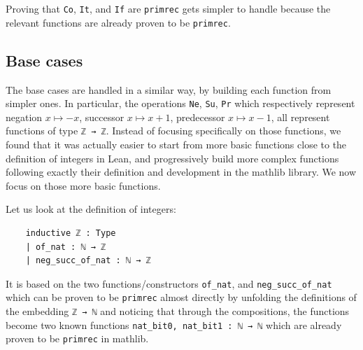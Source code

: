\documentclass[preprint]{elsarticle}
\theoremstyle{remark}
\newcommand{\MATHLIB}{\textsf{mathlib}\xspace}
\newcommand{\LEAN}{\textsf{Lean}\xspace}
\begin{document}
\vspace{\baselineskip}
Proving that \lstinline|Co|, \lstinline|It|, and \lstinline|If| are \lstinline|primrec| gets simpler to handle because the relevant functions are already proven to be \lstinline|primrec|.

\subsection{Base cases}
The base cases are handled in a similar way, by building each function from simpler ones. In particular, the operations \lstinline|Ne|, \lstinline|Su|, \lstinline|Pr| which respectively represent negation $x\mapsto-x$, successor $x\mapsto x+1$, predecessor $x\mapsto x-1$, all represent functions of type \lstinline|ℤ → ℤ|. Instead of focusing specifically on those functions, we found that it was actually easier to start from more basic functions close to the definition of integers in \LEAN, and progressively build more complex functions following exactly their definition and development in the \MATHLIB library. We now focus on those more basic functions.

\vspace{\baselineskip}
Let us look at the definition of integers:
\begin{lstlisting}
    inductive ℤ : Type
    | of_nat : ℕ → ℤ
    | neg_succ_of_nat : ℕ → ℤ
\end{lstlisting}
\noindent
It is based on the two functions/constructors \lstinline|of_nat|, and \lstinline|neg_succ_of_nat| which can be proven to be \lstinline|primrec| almost directly by unfolding the definitions of the embedding \lstinline|ℤ → ℕ| and noticing that through the compositions, the functions become two known functions \lstinline|nat_bit0, nat_bit1 : ℕ → ℕ| which are already proven to be \lstinline|primrec| in \MATHLIB.
\end{document}
